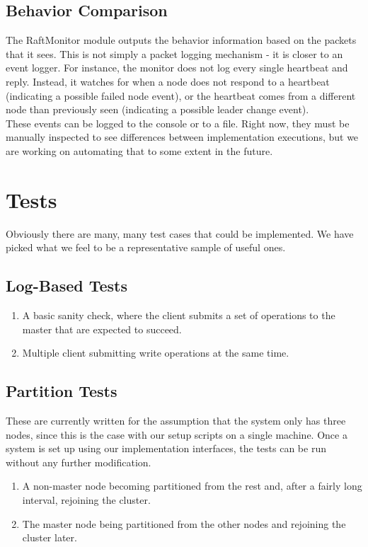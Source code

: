 \documentclass[UTF8]{article}
\begin{document}
\subsection{Behavior Comparison}
The RaftMonitor module outputs the behavior information based on the packets that it sees. This is not simply a packet logging mechanism - it is closer to an event logger. For instance, the monitor does not log every single heartbeat and reply. Instead, it watches for when a node does not respond to a heartbeat (indicating a possible failed node event), or the heartbeat comes from a different node than previously seen (indicating a possible leader change event). 
\\ \indent These events can be logged to the console or to a file. Right now, they must be manually inspected to see differences between implementation executions, but we are working on automating that to some extent in the future.
\section{Tests}
Obviously there are many, many test cases that could be implemented. We have picked what we feel to be a representative sample of useful ones.
\subsection{Log-Based Tests}
\begin{enumerate}
  \item A basic sanity check, where the client submits a set of operations to the master that are expected to succeed.
  \item Multiple client submitting write operations at the same time.
\end{enumerate}
\subsection{Partition Tests}
These are currently written for the assumption that the system only has three nodes, since this is the case with our setup scripts on a single machine. Once a system is set up using our implementation interfaces, the tests can be run without any further modification. 
\begin{enumerate}
  \item A non-master node becoming partitioned from the rest and, after a fairly long interval, rejoining the cluster.
  \item The master node being partitioned from the other nodes and rejoining the cluster later.
\end{enumerate}
\end{document}
